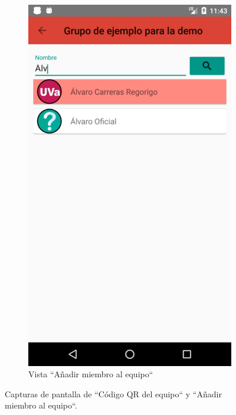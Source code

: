 \documentclass[twoside]{report}
\begin{document}
\begin{figure}[H]
\begin{center}
\begin{subfigure}[t]{.3\linewidth}
		\includegraphics[scale=0.25]{images/userguide/20.png}
		\caption{Vista “Añadir miembro al equipo“}
	\end{subfigure}\hspace{5mm}%
\caption{Capturas de pantalla de “Código QR del equipo“ y “Añadir miembro al equipo“.}
\end{center}
\end{figure}
\end{document}
